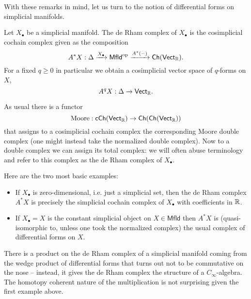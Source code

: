 \documentclass{amsart}
\begin{document}
With these remarks in mind, let us turn to the notion of differential forms on 
simplicial manifolds. 
\begin{definition}
    Let $X_\bullet$ be a simplicial manifold. The de Rham complex of $X_\bullet$ 
    is the cosimplicial cochain complex given as the composition
    \begin{equation*}
        A^*X : \Delta \xrightarrow{X_\bullet} \mathsf{Mfld}^{\text{op}}
        \xrightarrow{A^*(-)} \mathsf{Ch}(\mathsf{Vect}_{\mathbb{R}}).
    \end{equation*}
    For a fixed $q\geq 0$ in particular we obtain a cosimplicial vector space of
    $q$-forms on $X$,
    \begin{equation*}
        A^qX : \Delta \to \mathsf{Vect}_{\mathbb{R}}.
    \end{equation*}
\end{definition}

As usual there is a functor
\begin{equation*}
    \text{Moore}: \mathsf{cCh(Vect_{\mathbb{R}})} \to \mathsf{Ch(Ch(Vect_{\mathbb{R}}))}
\end{equation*}
that assigns to a cosimplicial cochain complex the corresponding Moore double 
complex (one might instead take the normalized double complex). Now to a double 
complex we can assign its total complex: we will often abuse terminology and 
refer to this complex as the de Rham complex of $X_\bullet$.

\begin{example}
    Here are the two most basic examples:
    \begin{itemize}
        \item If $X_\bullet$ is zero-dimensional, i.e. just a simplicial set,
            then the 
            de Rham complex $A^*X$ is precisely the simplicial cochain complex
            of $X_\bullet$ with coefficients in $\mathbb{R}$.
        \item If $X_\bullet=X$ is the constant simplicial object on $X\in 
            \mathsf{Mfld}$ then $A^*X$ is (quasi-isomorphic to, unless one took
            the normalized complex) the usual complex of differential forms on
            $X$.
    \end{itemize}
\end{example}

\begin{remark}
    There is a product on the de Rham complex of a simplicial manifold
    coming from the wedge product of differential forms that 
    turns out not to be commutative on the nose -- instead, it gives the de
    Rham complex the structure of a $C_\infty$-algebra. The homotopy coherent 
    nature of the multiplication is not surprising given the first example 
    above.
\end{remark}
\end{document}
